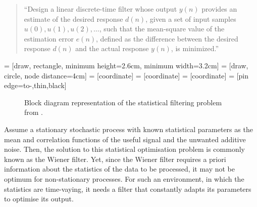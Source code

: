 \begin{quote}``Design a linear discrete-time filter whose output $y(n)$ provides an estimate of the desired response $d(n)$, given a set of input samples $u(0), u(1), u(2), \dots$, such that the mean-square value of the estimation error $e(n)$, defined as the difference between the desired response $d(n)$ and the actual response $y(n)$, is minimized.''
\end{quote}

 = [draw, rectangle, 
    minimum height=2.6cm, minimum width=3.2cm]
 = [draw, circle, node distance=4cm]
 = [coordinate]
 = [coordinate]
 = [coordinate]
 = [pin edge={to-,thin,black}]

\begin{figure}
\centering
{}
\caption{Block diagram representation of the statistical filtering problem from \cite{haykin2002adaptive}.} \label{fig:filtering_problem}
\end{figure}

Assume a stationary stochastic process with known statistical parameters as the mean and correlation functions of the useful signal and the unwanted additive noise. Then, the solution to this statistical optimisation problem is commonly known as the Wiener filter. Yet, since the Wiener filter requires a priori information about the statistics of the data to be processed, it may not be optimum for non-stationary processes. For such an environment, in which the statistics are time-vaying, it needs a filter that constantly adapts its parameters to optimise its output.


